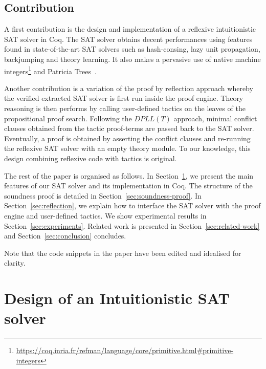 \documentclass[utf8,a4paper,UKenglish,cleveref, autoref, thm-restate]{lipics-v2021}
\begin{document}
\subsection{Contribution}

A first contribution is the design and implementation of a reflexive
intuitionistic SAT solver in Coq.  The SAT solver obtains decent
performances using features found in state-of-the-art SAT solvers such
as hash-consing, lazy unit propagation, backjumping and theory
learning. It also makes a pervasive use of native machine
integers\footnote{\url{https://coq.inria.fr/refman/language/core/primitive.html\#primitive-integers}}
and Patricia Trees~\cite{Okasaki98fastmergeable}.


Another contribution is a variation of the proof by reflection
approach whereby the verified extracted SAT solver is first run inside
the proof engine. Theory reasoning is then performs by calling
user-defined tactics on the leaves of the propositional proof search.
%
Following the $\mathit{DPLL(T)}$ approach, minimal conflict clauses
obtained from the tactic proof-terms are passed back to the SAT
solver. %
% 
Eventually, a proof is obtained by asserting the conflict clauses and
re-running the reflexive SAT solver with an empty theory module.
To our knowledge, this design
combining reflexive code with tactics is original.

The rest of the paper is organised as follows.
%
In Section~\ref{sec:design}, we present the main features of our SAT
solver and its implementation in Coq.
%
The structure of the soundness proof is detailed in Section~\ref{sec:soundness-proof}.
%
In Section~\ref{sec:reflection}, we explain how to interface the SAT
solver with the proof engine and  user-defined
tactics.
%
We show experimental results in Section~\ref{sec:experiments}.
%
Related work is presented in Section~\ref{sec:related-work} and
Section~\ref{sec:conclusion} concludes.

Note that the code snippets in the paper have been edited and
idealised for clarity. 

\section{Design of an Intuitionistic SAT solver}
\label{sec:design}
\end{document}
